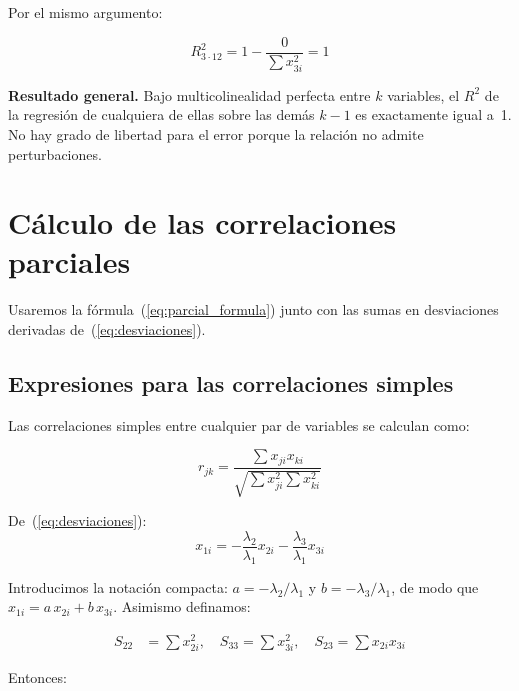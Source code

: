 \documentclass[12pt, letterpaper]{article}
\theoremstyle{remark}
\newcommand{\Rd}[2]{R^2_{#1 \cdot #2}} %
\begin{document}
\noindent Por el mismo argumento:

\begin{equation}
  \Rd{3}{12}
    = 1 - \frac{0}{\sum x_{3i}^2}
    = \boxed{1}
  \label{eq:R2_3_12}
\end{equation}

\begin{clave}
  \textbf{Resultado general.} Bajo multicolinealidad perfecta entre $k$ variables,
  el $R^2$ de la regresión de cualquiera de ellas sobre las demás $k-1$ es
  exactamente igual a~1. No hay grado de libertad para el error porque la
  relación no admite perturbaciones.
\end{clave}

\section{Cálculo de las correlaciones parciales}

Usaremos la fórmula~(\ref{eq:parcial_formula}) junto con las sumas en
desviaciones derivadas de~(\ref{eq:desviaciones}).

\subsection{Expresiones para las correlaciones simples}

Las correlaciones simples entre cualquier par de variables se calculan como:

\begin{equation}
  r_{jk} = \frac{\sum x_{ji} x_{ki}}{\sqrt{\sum x_{ji}^2 \sum x_{ki}^2}}
  \label{eq:rjk}
\end{equation}

De~(\ref{eq:desviaciones}):
\begin{equation}
  x_{1i} = -\frac{\lambda_2}{\lambda_1} x_{2i} - \frac{\lambda_3}{\lambda_1} x_{3i}
  \label{eq:x1_desv}
\end{equation}

Introducimos la notación compacta: $a = -\lambda_2/\lambda_1$ y
$b = -\lambda_3/\lambda_1$, de modo que $x_{1i} = a\,x_{2i} + b\,x_{3i}$.
Asimismo definamos:

\begin{align}
  S_{22} &= \sum x_{2i}^2, \quad
  S_{33} = \sum x_{3i}^2, \quad
  S_{23} = \sum x_{2i} x_{3i}
  \label{eq:sumas}
\end{align}

Entonces:
\end{document}

